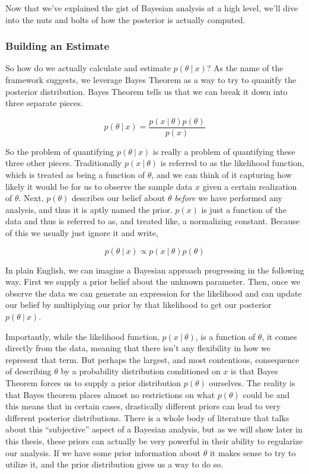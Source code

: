 \documentclass[12pt,twoside]{reedthesis}
\begin{document}
Now that we've explained the gist of Bayesian analysis at a high level, we'll dive into the nuts and bolts of how the posterior is actually computed.

\hypertarget{building-an-estimate}{%
\subsubsection{Building an Estimate}\label{building-an-estimate}}

So how do we actually calculate and estimate \(p(\theta \ | \ x)\)? As the name of the framework suggests, we leverage Bayes Theorem as a way to try to quanitfy the posterior distribution. Bayes Theorem tells us that we can break it down into three separate pieces.

\[
p(\theta \ | \ x) =  \frac{p(x \ | \ \theta)p(\theta)}{p(x)}
\]

So the problem of quantifying \(p(\theta \ | \ x)\) is really a problem of quantifying these three other pieces. Traditionally \(p(x \ | \ \theta)\) is referred to as the likelihood function, which is treated as being a function of \(\theta\), and we can think of it capturing how likely it would be for us to observe the sample data \(x\) given a certain realization of \(\theta\). Next, \(p(\theta)\) describes our belief about \(\theta\) \emph{before} we have performed any analysis, and thus it is aptly named the prior. \(p(x)\) is just a function of the data and thus is referred to as, and treated like, a normalizing constant. Because of this we usually just ignore it and write,

\[
p(\theta \ | \ x) \propto p(x \ | \ \theta)p(\theta)
\]

In plain English, we can imagine a Bayesian approach progressing in the following way. First we supply a prior belief about the unknown parameter. Then, once we observe the data we can generate an expression for the likelihood and can update our belief by multiplying our prior by that likelihood to get our posterior \(p(\theta \ | \ x)\).

Importantly, while the likelihood function, \(p(x \ | \ \theta)\), is a function of \(\theta\), it comes directly from the data, meaning that there isn't any flexibility in how we represent that term. But perhaps the largest, and most contentious, consequence of describing \(\theta\) by a probability distribution conditioned on \(x\) is that Bayes Theorem forces us to supply a prior distribution \(p(\theta)\) ourselves. The reality is that Bayes theorem places almost no restrictions on what \(p(\theta)\) could be and this means that in certain cases, drastically different priors can lead to very different posterior distributions. There is a whole body of literature that talks about this ``subjective'' aspect of a Bayesian analysis, but as we will show later in this thesis, these priors can actually be very powerful in their ability to regularize our analysis. If we have some prior information about \(\theta\) it makes sense to try to utilize it, and the prior distribution gives us a way to do so.
\end{document}
